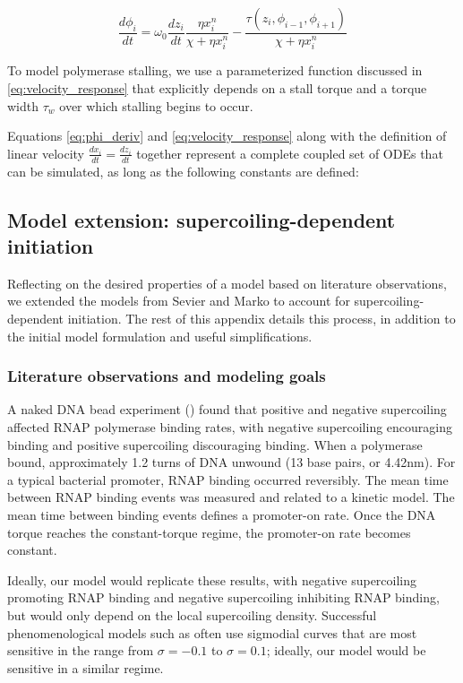 \documentclass[11pt]{article}
\begin{document}
\begin{equation}
    \frac{d\phi_i}{dt} = \omega_0 \frac{dz_i}{dt} \frac{\eta x_i^n}{\chi + \eta x_i^n} - \frac{\tau(z_i, \phi_{i-1}, \phi_{i+1})}{\chi + \eta x_i^n}
\end{equation} \label{eq:phi_deriv}

To model polymerase stalling, we use a parameterized function discussed in \cref{eq:velocity_response} that explicitly depends on a stall torque and a torque width \(\tau_w\) over which stalling begins to occur.

Equations \ref{eq:phi_deriv} and \ref{eq:velocity_response} along with the definition of linear velocity \(\frac{dx_i}{dt} = \frac{dz_i}{dt}\) together represent a complete coupled set of ODEs that can be simulated, as long as the following constants are defined:


\subsection{Model extension: supercoiling-dependent initiation} \label{sec:sc_initation}
Reflecting on the desired properties of a model based on literature observations, we extended the models from Sevier and Marko to account for supercoiling-dependent initiation. The rest of this appendix details this process, in addition to the initial model formulation and useful simplifications.

\subsubsection{Literature observations and modeling goals}
A naked DNA bead experiment (\textcite{revyakinPromoterUnwindingPromoter2004}) found that positive and negative supercoiling affected RNAP polymerase binding rates, with negative supercoiling encouraging binding and positive supercoiling discouraging binding. When a polymerase bound, approximately 1.2 turns of DNA unwound (13 base pairs, or 4.42nm). For a typical bacterial promoter, RNAP binding occurred reversibly. The mean time between RNAP binding events was measured and related to a kinetic model. The mean time between binding events defines a promoter-on rate. Once the DNA torque reaches the constant-torque regime, the promoter-on rate becomes constant.

Ideally, our model would replicate these results, with negative supercoiling promoting RNAP binding and negative supercoiling inhibiting RNAP binding, but would only depend on the local supercoiling density. Successful phenomenological models such as \textcite{elhoudaiguiBacterialGenomeArchitecture2019a} often use sigmodial curves that are most sensitive in the range from \(\sigma = -0.1\) to \(\sigma = 0.1\); ideally, our model would be sensitive in a similar regime.
\end{document}
